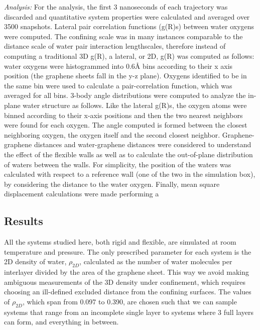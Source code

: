 \documentclass[12pt]{article}
\begin{document}
\textit{Analysis:} For the analysis, the first 3 nanoseconds of each trajectory was discarded and quantitative system properties were calculated and averaged over 3500 snapshots. Lateral pair correlation functions (g(R)s) between water oxygens were computed. The confining scale was in many instances comparable to the distance scale of water pair interaction lengthscales, therefore instead of computing a traditional 3D g(R), a lateral, or 2D, g(R) was computed as follows: water oxygens were histogrammed into 0.6\r A bins according to their x axis position (the graphene sheets fall in the y-z plane). Oxygens identified to be in the same bin were used to calculate a pair-correlation function, which was averaged for all bins. 3-body angle distributions were computed to analyze the in-plane water structure as follows. Like the lateral g(R)s, the oxygen atoms were binned according to their x-axis positions and then the two nearest neighbors were found for each oxygen. The angle computed is formed between the closest neighboring oxygen, the oxygen itself and the second closest neighbor. Graphene-graphene distances and water-graphene distances were considered to understand the effect of the flexible walls as well as to calculate the out-of-plane distribution of waters between the walls. For simplicity, the position of the waters was calculated with respect to a reference wall (one of the two in the simulation box), by considering the distance to the water oxygen. Finally, mean square displacement calculations were made performing a 

\subsection*{Results}

All the systems studied here, both rigid and flexible, are simulated at room temperature and pressure. The only prescribed parameter for each system is the 2D density of water, \(\rho_{2D}\), calculated as the number of water molecules per interlayer divided by the area of the graphene sheet. This way we avoid making ambiguous measurements of the 3D density under confinement, which requires choosing an ill-defined excluded distance from the confining surfaces. The values of \(\rho_{2D}\), which span from 0.097 to 0.390, are chosen such that we can sample systems that range from an incomplete single layer to systems where 3 full layers can form, and everything in between.
\end{document}
